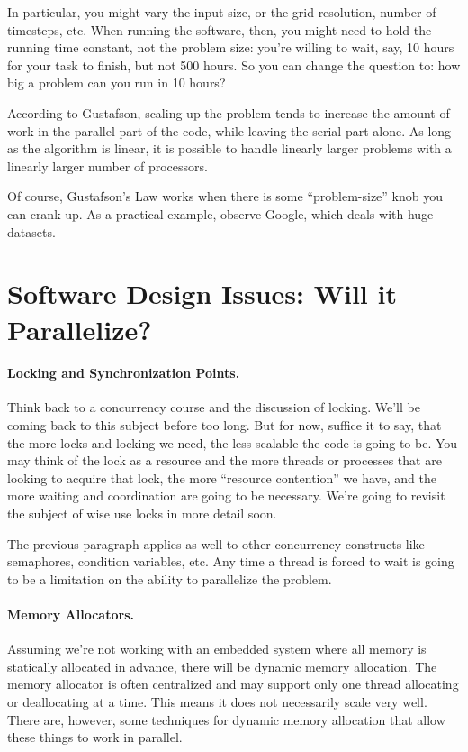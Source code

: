 \documentclass[a4paper]{report}
\begin{document}
In particular, you might vary the input size, or the grid resolution,
number of timesteps, etc. When running the software, then, you might
need to hold the running time constant, not the problem size: you're
willing to wait, say, 10 hours for your task to finish, but not 500
hours. So you can change the question to: how big a problem can you
run in 10 hours?

According to Gustafson, scaling up the problem tends to increase the
amount of work in the parallel part of the code, while leaving the
serial part alone. As long as the algorithm is linear, it is possible
to handle linearly larger problems with a linearly larger number of
processors.

Of course, Gustafson's Law works when there is some ``problem-size''
knob you can crank up.  As a practical example, observe Google, which
deals with huge datasets.


\section*{Software Design Issues: Will it Parallelize?}


\paragraph{Locking and Synchronization Points.}
Think back to a concurrency course and the discussion of locking. We'll be coming back to this subject before too long. But for now, suffice it to say, that the more locks and locking we need, the less scalable the code is going to be. You may think of the lock as a resource and the more threads or processes that are looking to acquire that lock, the more ``resource contention'' we have, and the more waiting and coordination are going to be necessary. We're going to revisit the subject of wise use locks in more detail soon.

The previous paragraph applies as well to other concurrency constructs like semaphores, condition variables, etc. Any time a thread is forced to wait is going to be a limitation on the ability to parallelize the problem.

\paragraph{Memory Allocators.}
Assuming we're not working with an embedded system where all memory is statically allocated in advance, there will be dynamic memory allocation. The memory allocator is often centralized and may support only one thread allocating or deallocating at a time. This means it does not necessarily scale very well. There are, however, some techniques for dynamic memory allocation that allow these things to work in parallel.
\end{document}

